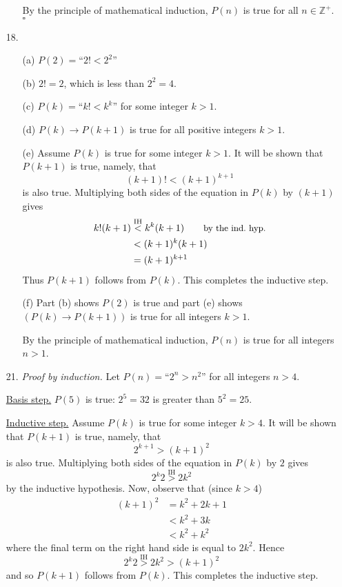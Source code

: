 \documentclass{article}
\begin{document}
\begin{enumerate}
\begin{itemize}
            By the principle of mathematical induction, $P(n)$ is true for all $n \in \mathbb{Z}^+$. $\square$
        \end{itemize}
    \item[18.]
        \begin{itemize}
            \item[(a)] $P(2) = \text{``}2! < 2^2\text{''}$
            \item[(b)] $2! = 2$, which is less than $2^2 = 4$.
            \item[(c)] $P(k) = \text{``}k! < k^k\text{''}$ for some integer $k > 1$.
            \item[(d)] $P(k) \rightarrow P(k+1)$ is true for all positive integers $k > 1$.
            \item[(e)] Assume $P(k)$ is true for some integer $k > 1$. It will be shown that $P(k+1)$ is true, namely, that
            \[
            (k+1)! < (k+1)^{k+1}
            \]
            is also true. Multiplying both sides of the equation in $P(k)$ by $(k+1)$ gives
            \begin{align*}
            k!(k+1) &\overset{\mathrm{IH}}{<} k^k (k+1)\tag*{\small{by the ind.~hyp.}}\\
            &< (k+1)^k (k+1)\\
            &= (k+1)^{k+1}
            \end{align*}
            Thus $P(k+1)$ follows from $P(k)$. This completes the inductive step.
            \item[(f)] Part (b) shows $P(2)$ is true and part (e) shows $\left( P(k) \rightarrow P(k+1) \right)$ is true for all integers $k > 1$.

            By the principle of mathematical induction, $P(n)$ is true for all integers $n > 1$.
        \end{itemize}
    \item[21.] \textit{Proof by induction.} Let $P(n) = \text{``}2^n > n^2\text{''}$ for all integers $n > 4$.

    \underline{Basis step.} $P(5)$ is true: $2^5 = 32$ is greater than $5^2 = 25$.

    \underline{Inductive step.} Assume $P(k)$ is true for some integer $k > 4$. It will be shown that $P(k+1)$ is true, namely, that
    \[
    2^{k+1} > (k+1)^2
    \]
    is also true. Multiplying both sides of the equation in $P(k)$ by $2$ gives
    \[
    2^k 2 \overset{\mathrm{IH}}{>} 2 k^2
    \]
    by the inductive hypothesis. Now, observe that (since $k>4$)
    \begin{align*}
    (k+1)^2 &= k^2 + 2k + 1\\
    &< k^2 + 3k\\
    &< k^2 + k^2
    \end{align*}
    where the final term on the right hand side is equal to $2k^2$. Hence
    \[
    2^k 2 \overset{\mathrm{IH}}{>} 2 k^2 > (k+1)^2
    \]
    and so $P(k+1)$ follows from $P(k)$. This completes the inductive step.


\end{enumerate}
\end{document}
